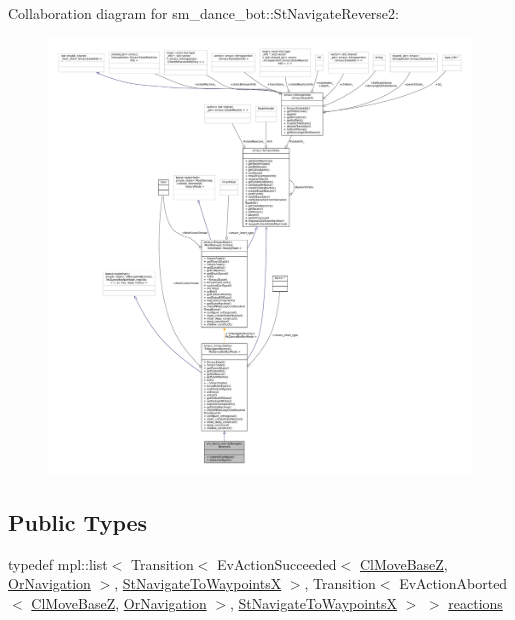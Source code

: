 Collaboration diagram for sm\+\_\+dance\+\_\+bot\+:\+:St\+Navigate\+Reverse2\+:
\nopagebreak
\begin{figure}[H]
\begin{center}
\leavevmode
\includegraphics[width=350pt]{structsm__dance__bot_1_1StNavigateReverse2__coll__graph}
\end{center}
\end{figure}
\subsection*{Public Types}
\begin{DoxyCompactItemize}
\item 
typedef mpl\+::list$<$ Transition$<$ Ev\+Action\+Succeeded$<$ \hyperlink{classmove__base__z__client_1_1ClMoveBaseZ}{Cl\+Move\+BaseZ}, \hyperlink{classsm__dance__bot_1_1OrNavigation}{Or\+Navigation} $>$, \hyperlink{structsm__dance__bot_1_1StNavigateToWaypointsX}{St\+Navigate\+To\+WaypointsX} $>$, Transition$<$ Ev\+Action\+Aborted$<$ \hyperlink{classmove__base__z__client_1_1ClMoveBaseZ}{Cl\+Move\+BaseZ}, \hyperlink{classsm__dance__bot_1_1OrNavigation}{Or\+Navigation} $>$, \hyperlink{structsm__dance__bot_1_1StNavigateToWaypointsX}{St\+Navigate\+To\+WaypointsX} $>$ $>$ \hyperlink{structsm__dance__bot_1_1StNavigateReverse2_a629dbeb24a7b120d7dfebeb4b9630d64}{reactions}
\end{DoxyCompactItemize}
